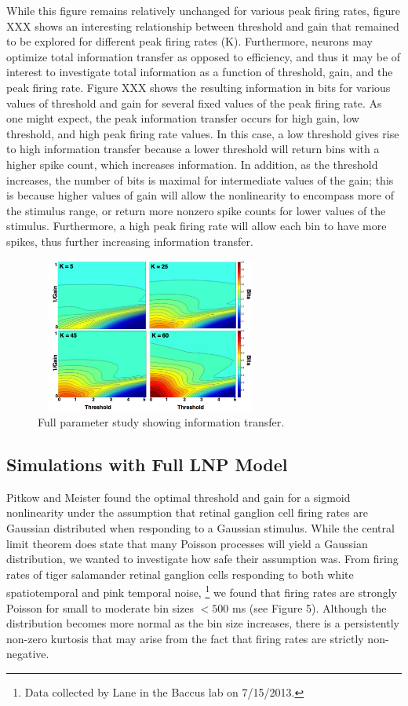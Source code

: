 \documentclass[12pt]{article}
\begin{document}
While this figure remains relatively unchanged for various peak firing rates, figure XXX shows an interesting relationship between threshold and gain that remained to be explored for different peak firing rates (K). Furthermore, neurons may optimize total information transfer as opposed to efficiency, and thus it may be of interest to investigate total information as a function of threshold, gain, and the peak firing rate. Figure XXX shows the resulting information in bits for various values of threshold and gain for several fixed values of the peak firing rate. As one might expect, the peak information transfer occurs for high gain, low threshold, and high peak firing rate values. In this case, a low threshold gives rise to high information transfer because a lower threshold will return bins with a higher spike count, which increases information. In addition, as the threshold increases, the number of bits is maximal for intermediate values of the gain; this is because higher values of gain will allow the nonlinearity to encompass more of the stimulus range, or return more nonzero spike counts for lower values of the stimulus. Furthermore, a high peak firing rate will allow each bin to have more spikes, thus further increasing information transfer. 

\begin{figure}[h!!]
\centerline{\includegraphics*[height = 2.0in,width=3.0in,angle=0]{InfoPeakFR.pdf}}
\label{Figure 4}
\caption{Full parameter study showing information transfer.}
\end{figure}

\subsection{Simulations with Full LNP Model}
Pitkow and Meister found the optimal threshold and gain for a sigmoid nonlinearity under the assumption that retinal ganglion cell firing rates are Gaussian distributed when responding to a Gaussian stimulus.  While the central limit theorem does state that many Poisson processes will yield a Gaussian distribution, we wanted to investigate how safe their assumption was.  From firing rates of tiger salamander retinal ganglion cells responding to both white spatiotemporal and pink temporal noise, \footnote{Data collected by Lane in the Baccus lab on 7/15/2013.} we found that firing rates are strongly Poisson for small to moderate bin sizes $< 500$ ms (see Figure 5).  Although the distribution becomes more normal as the bin size increases, there is a persistently non-zero kurtosis that may arise from the fact that firing rates are strictly non-negative.
\end{document}
